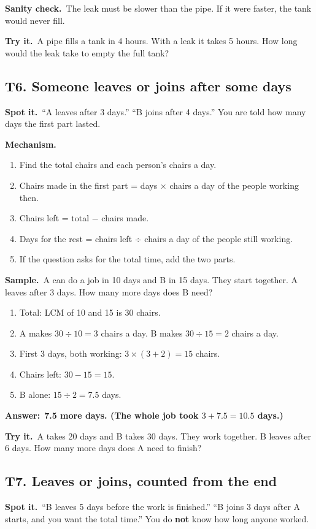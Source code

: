 \documentclass[11pt,a4paper]{article}
\let\oldsubsection\subsection
\renewcommand{\subsection}{\needspace{9\baselineskip}\oldsubsection}
\newcommand{\spot}{\textbf{\color{ember}Spot it.}\ }
\newcommand{\mech}{\textbf{\color{ember}Mechanism.}\ }
\newif\ifkeepsamp
\newcommand{\ans}[1]{\par\nopagebreak\noindent\textbf{\color{ember}Answer:}\ \textbf{#1}\par}
\newcommand{\samp}{\ifkeepsamp\needspace{4\baselineskip}\fi\textbf{\color{ember}Sample.}\ }
\newcommand{\sane}{\textbf{\color{slate}Sanity check.}\ }
\newcommand{\tryit}[1]{\textbf{\color{ember}Try it.}\ #1}
\begin{document}
\sane The leak must be slower than the pipe. If it were faster, the tank would never fill.

\tryit A pipe fills a tank in 4 hours. With a leak it takes 5 hours. How long would the leak take to empty the full tank?

\subsection{T6. Someone leaves or joins after some days}
\spot ``A leaves after 3 days.'' ``B joins after 4 days.'' You are told how many days the first part lasted.

\mech
\begin{enumerate}
\item Find the total chairs and each person's chairs a day.
\item Chairs made in the first part = days $\times$ chairs a day of the people working then.
\item Chairs left = total $-$ chairs made.
\item Days for the rest = chairs left $\div$ chairs a day of the people still working.
\item If the question asks for the total time, add the two parts.
\end{enumerate}

\samp A can do a job in 10 days and B in 15 days. They start together. A leaves after 3 days. How many more days does B need?
\begin{enumerate}
\item Total: LCM of 10 and 15 is 30 chairs.
\item A makes $30 \div 10 = 3$ chairs a day. B makes $30 \div 15 = 2$ chairs a day.
\item First 3 days, both working: $3 \times (3 + 2) = 15$ chairs.
\item Chairs left: $30 - 15 = 15$.
\item B alone: $15 \div 2 = 7.5$ days.
\end{enumerate}
\ans{7.5 more days. (The whole job took $3 + 7.5 = 10.5$ days.)}

\tryit A takes 20 days and B takes 30 days. They work together. B leaves after 6 days. How many more days does A need to finish?

\subsection{T7. Leaves or joins, counted from the end}
\spot ``B leaves 5 days before the work is finished.'' ``B joins 3 days after A starts, and you want the total time.'' You do \textbf{not} know how long anyone worked.
\end{document}
